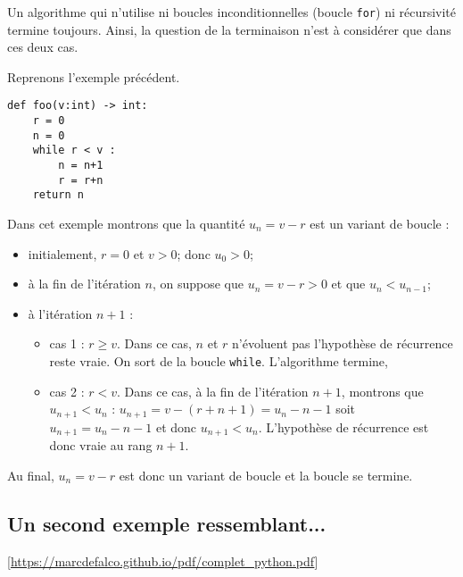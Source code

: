 \begin{prop}
Un algorithme qui n’utilise ni boucles inconditionnelles (boucle \texttt{for}) ni récursivité termine toujours. Ainsi,
la question de la terminaison n’est à considérer que dans ces deux cas.
\end{prop}

Reprenons l'exemple précédent. 
\begin{lstlisting}
def foo(v:int) -> int:
    r = 0
    n = 0
    while r < v : 
        n = n+1
        r = r+n
    return n
\end{lstlisting}

Dans cet exemple montrons que la quantité $u_n = v-r$ est un variant de boucle : 
\begin{itemize}
\item initialement, $r=0$ et $v>0$; donc  $u_0 > 0$;
\item à la fin de l'itération $n$, on suppose que $u_n = v-r >0$ et que $u_n < u_{n-1}$;
\item à l'itération $n+1$ : 
\begin{itemize}
\item cas 1 : $r\geq v$. Dans ce cas, $n$ et $r$ n'évoluent pas l'hypothèse de récurrence reste vraie. On sort de la boucle \texttt{while}. L'algorithme termine,
\item cas 2 : $r < v$. Dans ce cas, à la fin de l'itération $n+1$,  montrons que  $u_{n+1} < u_{n}$ : $u_{n+1} = v - (r + n + 1) =  u_n -n - 1$ soit $u_{n+1} =u_n -n - 1$ et donc $u_{n+1} < u_{n}$. L'hypothèse de récurrence est donc vraie au rang $n+1$. 
\end{itemize}
\end{itemize}

Au final, $u_n = v-r$ est donc un variant de boucle et la boucle se termine.


\subsection{Un second exemple ressemblant...} 

\begin{flushright}
\footnotesize
[\url{https://marcdefalco.github.io/pdf/complet_python.pdf}]
\normalsize
\end{flushright}

